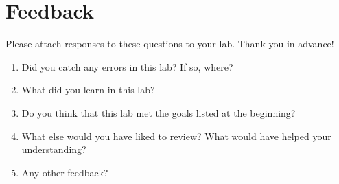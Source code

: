 \documentclass[answers]{exam}
\begin{document}
\pagebreak

\section{Feedback}

Please attach responses to these questions to your lab. Thank you in advance!

\begin{enumerate}
\item Did you catch any errors in this lab? If so, where?
\item What did you learn in this lab?
\item Do you think that this lab met the goals listed at the beginning?
\item What else would you have liked to review? What would have helped your understanding?
\item Any other feedback?
\end{enumerate}
\end{document}
